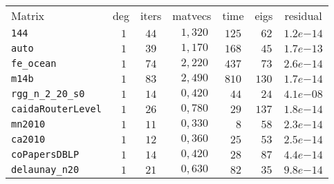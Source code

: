 \begin{tabular}{l|c|c|c|c|c|c}
\hline
\multirow{2}{*}{Matrix} & \multirow{2}{*}{deg} & \multirow{2}{*}{iters} & \multirow{2}{*}{matvecs} & \multirow{2}{*}{time} & \multirow{2}{*}{eigs} & \multirow{2}{*}{residual} \\
 & & & & & & \\\hline
\hline
\verb|144| & $\phantom{0}1$ & $44$ & $\phantom{0}1,320$ & $125$ & $\phantom{0}62$ & $1.2e{-14}$ \\\hline
\verb|auto| & $\phantom{0}1$ & $39$ & $\phantom{0}1,170$ & $168$ & $\phantom{0}45$ & $1.7e{-13}$ \\\hline
\verb|fe_ocean| & $\phantom{0}1$ & $74$ & $\phantom{0}2,220$ & $437$ & $\phantom{0}73$ & $2.6e{-14}$ \\\hline
\verb|m14b| & $\phantom{0}1$ & $83$ & $\phantom{0}2,490$ & $810$ & $130$ & $1.7e{-14}$ \\\hline
\verb|rgg_n_2_20_s0| & $\phantom{0}1$ & $14$ & $\phantom{0}0,420$ & $\phantom{0}44$ & $\phantom{0}24$ & $4.1e{-08}$ \\\hline
\verb|caidaRouterLevel| & $\phantom{0}1$ & $26$ & $\phantom{0}0,780$ & $\phantom{0}29$ & $137$ & $1.8e{-14}$ \\\hline
\verb|mn2010| & $\phantom{0}1$ & $11$ & $\phantom{0}0,330$ & $\phantom{00}8$ & $\phantom{0}58$ & $2.3e{-14}$ \\\hline
\verb|ca2010| & $\phantom{0}1$ & $12$ & $\phantom{0}0,360$ & $\phantom{0}25$ & $\phantom{0}53$ & $2.5e{-14}$ \\\hline
\verb|coPapersDBLP| & $\phantom{0}1$ & $14$ & $\phantom{0}0,420$ & $\phantom{0}28$ & $\phantom{0}87$ & $4.4e{-14}$ \\\hline
\verb|delaunay_n20| & $\phantom{0}1$ & $21$ & $\phantom{0}0,630$ & $\phantom{0}82$ & $\phantom{0}35$ & $9.8e{-14}$ \\\hline
\end{tabular}